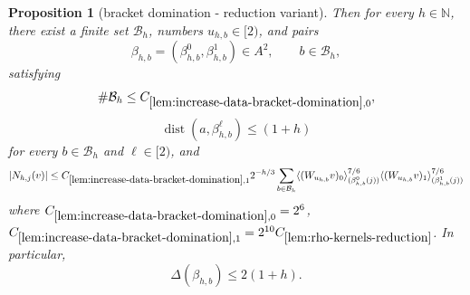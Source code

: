 \documentclass[12pt,reqno]{amsart}
\theoremstyle{plain}
\newtheorem{proposition}[theorem]{Proposition}
\numberwithin{equation}{section}
\theoremstyle{remark}
\DeclareMathOperator{\dist}{dist}
\begin{document}
\begin{proposition}[bracket domination - reduction variant]
Then for every \(h\in\mathbb N\), there exist a finite set
\(\mathcal B_h\), numbers \(u_{h,b}\in[2)\), and pairs
\begin{equation}\label{auto:increase-data-scale-pairs}
\beta_{h,b}
=
(\beta_{h,b}^0,\beta_{h,b}^1)\in A^2,
\qquad b\in\mathcal B_h,
\end{equation}
satisfying
\begin{equation}
    \label{E:increase-data-B-cardinality}
    \#\mathcal B_h
    \leq
    C_{\ref{lem:increase-data-bracket-domination},0},
\end{equation}
\begin{equation}
    \label{E:increase-data-beta-base-distance}
    \dist(a,\beta_{h,b}^\ell)
    \leq
     (1+h)
\end{equation}
for every \(b\in\mathcal B_h\) and \(\ell\in[2)\), and
\begin{equation}
    \label{E:increase-data-bracket-majorant}
    |N_{h,j}(v)| \leq C_{\ref{lem:increase-data-bracket-domination},1} 2^{-h/3} \sum_{b\in\mathcal B_h} \langle(W_{u_{h,b}}v)_0 \rangle_{(\beta_{h,b}^0(j))}^{7/6} \langle(W_{u_{h,b}}v)_1 \rangle_{(\beta_{h,b}^1(j))}^{7/6}
\end{equation}
where $C_{\ref{lem:increase-data-bracket-domination},0}=2^6$, $C_{\ref{lem:increase-data-bracket-domination},1}
=
2^{10}C_{\ref{lem:rho-kernels-reduction}}$.
In particular,
\begin{equation}
    \label{E:increase-data-beta-pair-distance}
    \Delta(\beta_{h,b})
    \leq
    2(1+h).
\end{equation}
\end{proposition}
\end{document}

